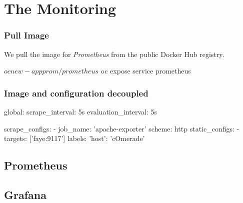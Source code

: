 
\section{The Monitoring}

\begin{frame}[fragile]
  \frametitle{Pull Image}
  We pull the image for \emph{Prometheus} from the public Docker Hub registry.
  \begin{bashcode}
    $ oc new-app prom/prometheus
    $ oc expose service prometheus
  \end{bashcode}
\end{frame}

\begin{frame}[fragile]
  \frametitle{Image and configuration decoupled}
  \begin{yamlcode}
    global:
      scrape_interval:     5s 
      evaluation_interval: 5s 

    scrape_configs:
      - job_name: 'apache-exporter'
        scheme: http
        static_configs:
        - targets: ['faye:9117']
          labels: {'host': 'cOmerade'}

  \end{yamlcode}
\end{frame}

\subsection{Prometheus}



\subsection{Grafana}